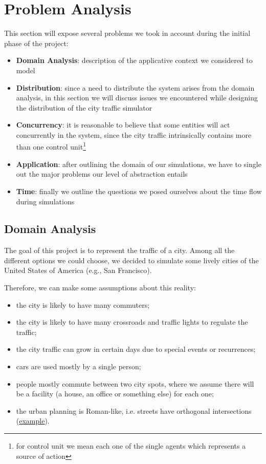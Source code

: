 \section{Problem Analysis}

This section will expose several problems we took in account during the
initial phase of the project:

\begin{itemize}
\item \textbf{Domain Analysis}: description of the applicative context we
  considered to model
\item \textbf{Distribution}: since a need to distribute the system arises from
  the domain analysis, in this section we will discuss issues we encountered
  while designing the distribution of the city traffic simulator
\item \textbf{Concurrency}: it is reasonable to believe that some entities
  will act concurrently in the system, since the city traffic intrinsically
  contains more than one control unit\footnote{for control unit we mean each
  one of the single agents which represents a source of action}
\item \textbf{Application}: after outlining the domain of our simulations, we
  have to single out the major problems our level of abstraction entails
\item \textbf{Time}: finally we outline the questions we posed ourselves about
  the time flow during simulations
\end{itemize}


\subsection{Domain Analysis}\label{sec:pa-domain}
The goal of this project is to represent the traffic of a city. Among all the
different options we could choose, we decided to simulate some lively cities of
the United States of America (e.g., San Francisco).

Therefore, we can make some assumptions about this reality:

\begin{itemize}
\item the city is likely to have many commuters;
\item the city is likely to have many crossroads and traffic lights to
  regulate the traffic;
\item the city traffic can grow in certain days due to special events or
  recurrences;
\item cars are used mostly by a single person;
\item people mostly commute between two city spots, where we assume there
  will be a facility (a house, an office or something else) for each one;
\item the urban planning is Roman-like, i.e. streets have orthogonal
  intersections (\href{https://www.google.it/maps/place/San+Francisco,+California,+Stati+Uniti/@37.7766566,-122.4330836,16z/data=!4m2!3m1!1s0x80859a6d00690021:0x4a501367f076adff}{example}).
\end{itemize}

